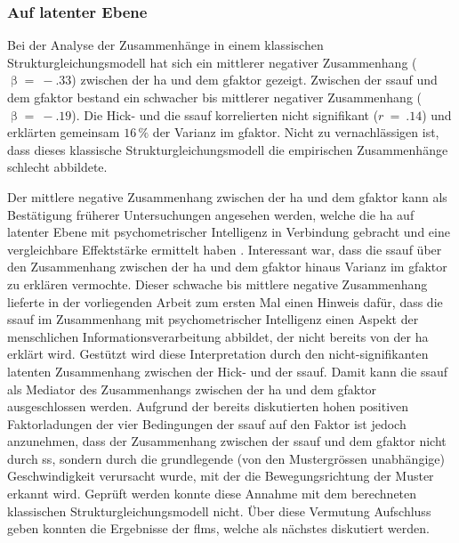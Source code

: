\documentclass[11pt, twoside, a4paper]{book}		%
\begin{document}
\subsubsection*{Auf latenter Ebene}


Bei der Analyse der Zusammenhänge in einem klassischen Strukturgleichungsmodell hat sich ein mittlerer negativer Zusammenhang ($\upbeta=~-.33$) zwischen der \gls{ha} und dem \gls{gfaktor} gezeigt. Zwischen der \gls{ssauf} und dem \gls{gfaktor} bestand ein schwacher bis mittlerer negativer Zusammenhang ($\upbeta=~-.19$). Die Hick- und die \gls{ssauf} korrelierten nicht signifikant ($r~=~.14$) und erklärten gemeinsam $16\,\%$ der Varianz im \gls{gfaktor}. Nicht zu vernachlässigen ist, dass dieses klassische Strukturgleichungsmodell die empirischen Zusammenhänge schlecht abbildete.

Der mittlere negative Zusammenhang zwischen der \gls{ha} und dem \gls{gfaktor} kann als Bestätigung früherer Untersuchungen angesehen werden, welche die \gls{ha} auf latenter Ebene mit psychometrischer Intelligenz in Verbindung gebracht und eine vergleichbare Effektstärke ermittelt haben \citep[z.~B.][]{Borter2016, Helmbold2007, Schweizer2006b, Rammsayer2007}.
Interessant war, dass die \gls{ssauf} über den Zusammenhang zwischen der \gls{ha} und dem \gls{gfaktor} hinaus Varianz im \gls{gfaktor} zu erklären vermochte. Dieser schwache bis mittlere negative Zusammenhang lieferte in der vorliegenden Arbeit zum ersten Mal einen Hinweis dafür, dass die \gls{ssauf} im Zusammenhang mit psychometrischer Intelligenz einen Aspekt der menschlichen Informationsverarbeitung abbildet, der nicht bereits von der \gls{ha} erklärt wird. Gestützt wird diese Interpretation durch den nicht-signifikanten latenten Zusammenhang zwischen der Hick- und der \gls{ssauf}. 
Damit kann die \gls{ssauf} als Mediator des Zusammenhangs zwischen der \gls{ha} und dem \gls{gfaktor} ausgeschlossen werden.
Aufgrund der bereits diskutierten hohen positiven Faktorladungen der vier Bedingungen der \gls{ssauf} auf den Faktor ist jedoch anzunehmen, dass der Zusammenhang zwischen der \gls{ssauf} und dem \gls{gfaktor} nicht durch \gls{ss}, sondern durch die grundlegende (von den Mustergrössen unabhängige) Geschwindigkeit verursacht wurde, mit der die Bewegungsrichtung der Muster erkannt wird. 
Geprüft werden konnte diese Annahme mit dem berechneten klassischen Strukturgleichungsmodell nicht. Über diese Vermutung Aufschluss geben konnten die Ergebnisse der \glspl{flm}, welche als nächstes diskutiert werden.
\end{document}
